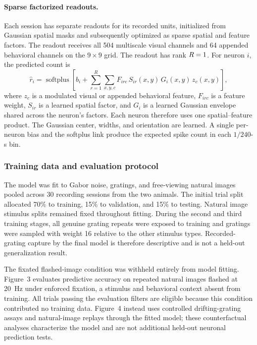 \documentclass{lite}
\begin{document}
\paragraph{Sparse factorized readouts.} Each session has separate readouts for its recorded units, initialized from Gaussian spatial masks \cite{lurz2020generalization} and subsequently optimized as sparse spatial and feature factors. The readout receives all 504 multiscale visual channels and 64 appended behavioral channels on the $9\times9$ grid. The readout has rank $R=1$. For neuron $i$, the predicted count is
\begin{equation}
\hat r_i = \operatorname{softplus}\!\left[
 b_i + \sum_{r=1}^{R}\sum_{x,y,c}
 F_{irc}\,S_{ir}(x,y)\,G_i(x,y)\,z_c(x,y)
\right],
\end{equation}
where $z_c$ is a modulated visual or appended behavioral feature, $F_{irc}$ is a feature weight, $S_{ir}$ is a learned spatial factor, and $G_i$ is a learned Gaussian envelope shared across the neuron's factors. Each neuron therefore uses one spatial--feature product. The Gaussian center, widths, and orientation are learned. A single per-neuron bias and the softplus link produce the expected spike count in each $1/240$-s bin.

\subsubsection{Training data and evaluation protocol}
The model was fit to Gabor noise, gratings, and free-viewing natural images pooled across 30 recording sessions from the two animals. The initial trial split allocated 70\% to training, 15\% to validation, and 15\% to testing. Natural image stimulus splits remained fixed throughout fitting. During the second and third training stages, all genuine grating repeats were exposed to training and gratings were sampled with weight 16 relative to the other stimulus types. Recorded-grating capture by the final model is therefore descriptive and is not a held-out generalization result.

The fixated flashed-image condition was withheld entirely from model fitting. Figure~3 evaluates predictive accuracy on repeated natural images flashed at 20~Hz under enforced fixation, a stimulus and behavioral context absent from training. All trials passing the evaluation filters are eligible because this condition contributed no training data. Figure~4 instead uses controlled drifting-grating assays and natural-image replays through the fitted model; these counterfactual analyses characterize the model and are not additional held-out neuronal prediction tests.
\end{document}

